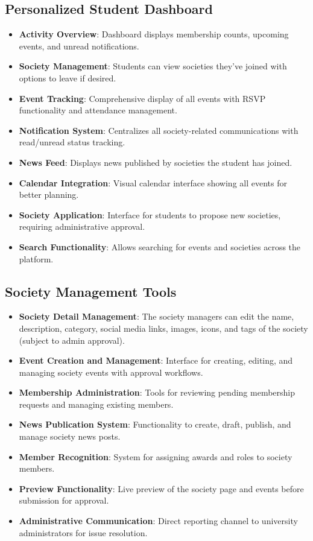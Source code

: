 \subsection{Personalized Student Dashboard}
\begin{itemize}
    \item \textbf{Activity Overview}: Dashboard displays membership counts, upcoming events, and unread notifications.
    \item \textbf{Society Management}: Students can view societies they've joined with options to leave if desired.
    \item \textbf{Event Tracking}: Comprehensive display of all events with RSVP functionality and attendance management.
    \item \textbf{Notification System}: Centralizes all society-related communications with read/unread status tracking.
    \item \textbf{News Feed}: Displays news published by societies the student has joined.
    \item \textbf{Calendar Integration}: Visual calendar interface showing all events for better planning.
    \item \textbf{Society Application}: Interface for students to propose new societies, requiring administrative approval.
    \item \textbf{Search Functionality}: Allows searching for events and societies across the platform.
\end{itemize}

\subsection{Society Management Tools}
\begin{itemize}
    \item \textbf{Society Detail Management}: The society managers can edit the name, description, category, social media links, images, icons, and tags of the society (subject to admin approval).
    \item \textbf{Event Creation and Management}: Interface for creating, editing, and managing society events with approval workflows.
    \item \textbf{Membership Administration}: Tools for reviewing pending membership requests and managing existing members.
    \item \textbf{News Publication System}: Functionality to create, draft, publish, and manage society news posts.
    \item \textbf{Member Recognition}: System for assigning awards and roles to society members.
    \item \textbf{Preview Functionality}: Live preview of the society page and events before submission for approval.
    \item \textbf{Administrative Communication}: Direct reporting channel to university administrators for issue resolution.
\end{itemize}


